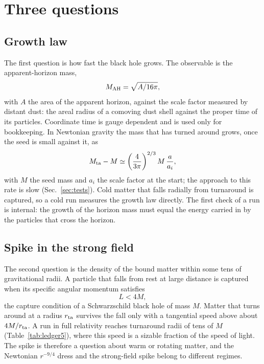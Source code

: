 \documentclass[aps,prd,twocolumn,10pt,superscriptaddress,nofootinbib,longbibliography,floatfix]{revtex4-2}
\newcommand{\MAH}{M_{\rm AH}}
\begin{document}
\section{Three questions}\label{sec:problem}

\subsection{Growth law}

The first question is how fast the black hole grows. The observable is the apparent-horizon mass,
\begin{equation}
\MAH=\sqrt{A/16\pi},
\end{equation}
with $A$ the area of the apparent horizon, against the scale factor measured by distant dust: the areal radius of a comoving dust shell against the proper time of its particles. Coordinate time is gauge dependent and is used only for bookkeeping. In Newtonian gravity the mass that has turned around grows, once the seed is small against it, as
\begin{equation}
M_{\rm ta}-M\simeq\left(\frac{4}{3\pi}\right)^{2/3}M\,\frac{a}{a_i},
\end{equation}
with $M$ the seed mass and $a_i$ the scale factor at the start; the approach to this rate is slow (Sec.~\ref{sec:tests}). Cold matter that falls radially from turnaround is captured, so a cold run measures the growth law directly. The first check of a run is internal: the growth of the horizon mass must equal the energy carried in by the particles that cross the horizon.

\subsection{Spike in the strong field}

The second question is the density of the bound matter within some tens of gravitational radii. A particle that falls from rest at large distance is captured when its specific angular momentum satisfies
\begin{equation}
L<4M,
\end{equation}
the capture condition of a Schwarzschild black hole of mass $M$. Matter that turns around at a radius $r_{\rm ta}$ survives the fall only with a tangential speed above about $4M/r_{\rm ta}$. A run in full relativity reaches turnaround radii of tens of $M$ (Table~\ref{tab:ledger5}), where this speed is a sizable fraction of the speed of light. The spike is therefore a question about warm or rotating matter, and the Newtonian $r^{-9/4}$ dress and the strong-field spike belong to different regimes.
\end{document}
